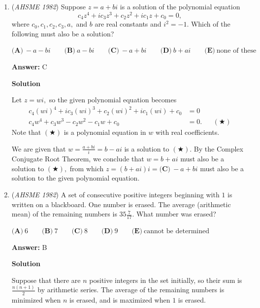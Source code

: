 \begin{enumerate}
 Notice that $r^2\equiv 1,4,9,0 \pmod{16}$.

 Now $ab3c$ in base 8 is $a8^3+b8^2+3(8)+c\equiv 8+c\pmod{16}$. It being a perfect square means $8+c\equiv 1,4,9,0 \pmod{16}$. That means that c can only be 1 so the answer is 1 = $\boxed{\textbf{(B)}.}$.

 


	\item (\textit{AHSME 1982}) Suppose $z=a+bi$ is a solution of the polynomial equation 
 \[c_4z^4+ic_3z^3+c_2z^2+ic_1z+c_0=0,\] where $c_0, c_1, c_2, c_3, a,$ and $b$ are real constants and $i^2=-1.$ Which of the following must also be a solution? 


 $\textbf{(A)}\ -a-bi\qquad  \textbf{(B)}\ a-bi\qquad  \textbf{(C)}\ -a+bi\qquad  \textbf{(D)}\ b+ai \qquad  \textbf{(E)}\ \text{none of these}$

 \textbf{Answer: }C



\textbf{Solution}

Let $z=wi,$ so the given polynomial equation becomes
 \begin{align*} c_4(wi)^4+ic_3(wi)^3+c_2(wi)^2+ic_1(wi)+c_0&=0 \\ c_4w^4+c_3w^3-c_2w^2-c_1w+c_0&=0. &&(\bigstar) \end{align*}
Note that $(\bigstar)$ is a polynomial equation in $w$ with real coefficients.

 We are given that $w=\frac{a+bi}{i}=b-ai$ is a solution to $(\bigstar).$ By the Complex Conjugate Root Theorem, we conclude that $w=b+ai$ must also be a solution to $(\bigstar),$ from which $z=(b+ai)i=\boxed{\textbf{(C)}\ -a+bi}$ must also be a solution to the given polynomial equation.

 


	\item (\textit{AHSME 1982}) A set of consecutive positive integers beginning with $1$ is written on a blackboard. One number is erased. The average (arithmetic mean) of the remaining numbers is $35\frac{7}{17}$. What number was erased? 


 $\textbf{(A)}\ 6\qquad  \textbf{(B)}\ 7 \qquad  \textbf{(C)}\ 8 \qquad  \textbf{(D)}\  9\qquad  \textbf{(E)}\ \text{cannot be determined}$

 \textbf{Answer: }B



\textbf{Solution}

Suppose that there are $n$ positive integers in the set initially, so their sum is $\frac{n(n+1)}{2}$ by arithmetic series. The average of the remaining numbers is minimized when $n$ is erased, and is maximized when $1$ is erased.


\end{enumerate}

